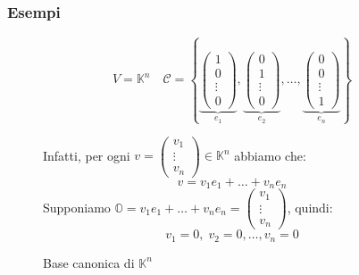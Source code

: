 \documentclass[a4paper]{article}
\theoremstyle{break}
\theoremstyle{break}
\theoremstyle{break}
\theoremstyle{break}
\begin{document}
\subsubsection{Esempi}
\begin{figure}[H]
  \begin{example}
    \[
      V = \mathbb{K}^n \quad \mathcal{C} = \left\{ \underbrace{\begin{pmatrix} 
          1\\
          0\\
          \vdots\\
          0
      \end{pmatrix}}_{e_1},
      \underbrace{\begin{pmatrix} 
        0\\
        1\\
        \vdots\\
        0
    \end{pmatrix}}_{e_2},
    \ldots,
    \underbrace{\begin{pmatrix} 
      0\\
      0\\
      \vdots\\
      1
  \end{pmatrix}}_{e_n}
\right\}
    \] 

    \begin{center}
      \caption{Base canonica di \( \mathbb{K}^n \) }
    \end{center}
    Infatti, per ogni \( v = \begin{pmatrix} 
        v_1\\
        \vdots\\
        v_n
    \end{pmatrix} \in \mathbb{K}^n \) abbiamo che:
    \[
    v = v_1 e_1 + \ldots + v_n e_n
    \] 
    Supponiamo \( \mathbb{O} = v_1 e_1 + \ldots + v_n e_n = \begin{pmatrix} 
    v_1\\
    \vdots\\
    v_n
    \end{pmatrix}  \), quindi: \[ v_1 = 0,\; v_2 = 0, \ldots, v_n = 0 \]
  \end{example}
\end{figure}
\end{document}
